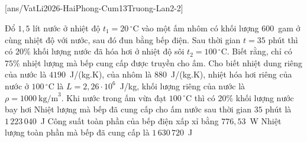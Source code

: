 	\subsection*{}
	\setcounter{ex}{0}
	[ans/VatLi2026-HaiPhong-Cum13Truong-Lan2-2]

	\begin{ex}%
		Đổ $1{,}5$ lít nước ở nhiệt độ $t_1=20\,^\circ\text{C}$ vào một ấm nhôm có khối lượng $600$~gam ở cùng nhiệt độ với nước, sau đó đun bằng bếp điện. Sau thời gian $t=35$ phút thì có $20\%$ khối lượng nước đã hóa hơi ở nhiệt độ sôi $t_2=100\,^\circ\text{C}$. Biết rằng, chỉ có $75\%$ nhiệt lượng mà bếp cung cấp được truyền cho ấm. Cho biết nhiệt dung riêng của nước là $4190$~J/(kg.K), của nhôm là $880$~J/(kg.K), nhiệt hóa hơi riêng của nước ở $100\,^\circ\text{C}$ là $L=2{,}26\cdot 10^6$~J/kg, khối lượng riêng của nước là $\rho=1000~\text{kg/m}^3$.
		\choiceTFt
		{Khi nước trong ấm vừa đạt $100\,^\circ\text{C}$ thì có $20\%$ khối lượng nước bay hơi}
		{\True Nhiệt lượng mà bếp đã cung cấp cho ấm nước sau thời gian $35$ phút là $1\,223\,040$~J}
		{\True Công suất toàn phần của bếp điện xấp xỉ bằng $776{,}53$~W}
		{\True Nhiệt lượng toàn phần mà bếp đã cung cấp là $1\,630\,720$~J}
	\end{ex}

